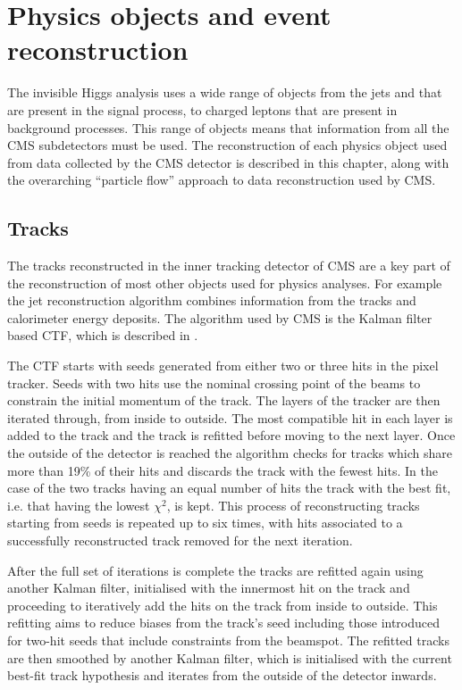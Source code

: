 \chapter{Physics objects and event reconstruction}
\label{chap:obj}
The invisible Higgs analysis uses a wide range of objects from the jets and \MET that are present in the signal process, to charged leptons that are present in background processes. This range of objects means that information from all the CMS subdetectors must be used. The reconstruction of each physics object used from data collected by the CMS detector is described in this chapter, along with the overarching ``particle flow'' approach to data reconstruction used by CMS.

\section{Tracks}
\label{sec:tracks}
The tracks reconstructed in the inner tracking detector of CMS are a key part of the reconstruction of most other objects used for physics analyses. For example the jet reconstruction algorithm combines information from the tracks and calorimeter energy deposits. The algorithm used by CMS is the Kalman filter based \ac{CTF}, which is described in . 

The \ac{CTF} starts with seeds generated from either two or three hits in the pixel tracker. Seeds with two hits use the nominal crossing point of the beams to constrain the initial momentum of the track. The layers of the tracker are then iterated through, from inside to outside. The most compatible hit in each layer is added to the track and the track is refitted before moving to the next layer. Once the outside of the detector is reached the algorithm checks for tracks which share more than 19\% of their hits and discards the track with the fewest hits. In the case of the two tracks having an equal number of hits the track with the best fit, i.e. that having the lowest $\chi^{2}$, is kept. This process of reconstructing tracks starting from seeds is repeated up to six times, with hits associated to a successfully reconstructed track removed for the next iteration. 

After the full set of iterations is complete the tracks are refitted again using another Kalman filter, initialised with the innermost hit on the track and proceeding to iteratively add the hits on the track from inside to outside. This refitting aims to reduce biases from the track's seed including those introduced for two-hit seeds that include constraints from the beamspot. The refitted tracks are then smoothed by another Kalman filter, which is initialised with the current best-fit track hypothesis and iterates from the outside of the detector inwards. 

